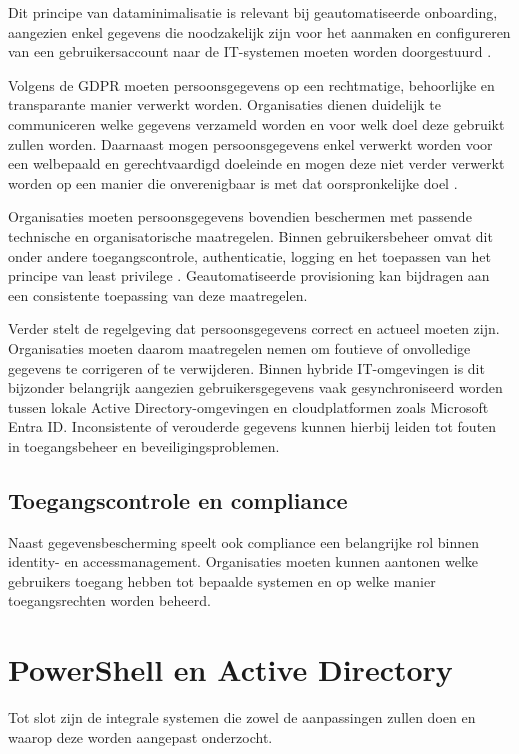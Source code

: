 Dit principe van dataminimalisatie is relevant bij geautomatiseerde onboarding, aangezien enkel gegevens die noodzakelijk zijn voor het aanmaken en configureren van een gebruikersaccount naar de IT-systemen moeten worden doorgestuurd \autocite{Vlaanderen}.

Volgens de GDPR moeten persoonsgegevens op een rechtmatige, behoorlijke en transparante manier verwerkt worden. Organisaties dienen duidelijk te communiceren welke gegevens verzameld worden en voor welk doel deze gebruikt zullen worden. Daarnaast mogen persoonsgegevens enkel verwerkt worden voor een welbepaald en gerechtvaardigd doeleinde en mogen deze niet verder verwerkt worden op een manier die onverenigbaar is met dat oorspronkelijke doel \autocite{Vlaanderen}.

Organisaties moeten persoonsgegevens bovendien beschermen met passende technische en organisatorische maatregelen. Binnen gebruikersbeheer omvat dit onder andere toegangscontrole, authenticatie, logging en het toepassen van het principe van least privilege \autocite{Vlaanderen}. Geautomatiseerde provisioning kan bijdragen aan een consistente toepassing van deze maatregelen.

Verder stelt de regelgeving dat persoonsgegevens correct en actueel moeten zijn. Organisaties moeten daarom maatregelen nemen om foutieve of onvolledige gegevens te corrigeren of te verwijderen. Binnen hybride IT-omgevingen is dit bijzonder belangrijk aangezien gebruikersgegevens vaak gesynchroniseerd worden tussen lokale Active Directory-omgevingen en cloudplatformen zoals Microsoft Entra ID. Inconsistente of verouderde gegevens kunnen hierbij leiden tot fouten in toegangsbeheer en beveiligingsproblemen.

\subsection{Toegangscontrole en compliance}

Naast gegevensbescherming speelt ook compliance een belangrijke rol binnen identity- en accessmanagement. Organisaties moeten kunnen aantonen welke gebruikers toegang hebben tot bepaalde systemen en op welke manier toegangsrechten worden beheerd.

\section{PowerShell en Active Directory}

Tot slot zijn de integrale systemen die zowel de aanpassingen zullen doen en waarop deze worden aangepast onderzocht. 

